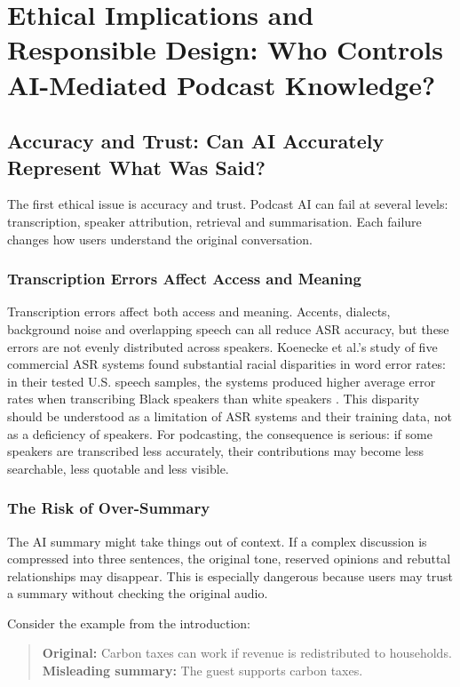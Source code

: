 \documentclass[11pt,a4paper]{article}
\begin{document}
\section{Ethical Implications and Responsible Design: Who Controls AI-Mediated Podcast Knowledge?}


\subsection{Accuracy and Trust: Can AI Accurately Represent What Was Said?}

The first ethical issue is accuracy and trust. Podcast AI can fail at several levels: transcription, speaker attribution, retrieval and summarisation. Each failure changes how users understand the original conversation.

\subsubsection{Transcription Errors Affect Access and Meaning}


Transcription errors affect both access and meaning. Accents, dialects, background noise and overlapping speech can all reduce ASR accuracy, but these errors are not evenly distributed across speakers. Koenecke et al.'s study of five commercial ASR systems found substantial racial disparities in word error rates: in their tested U.S. speech samples, the systems produced higher average error rates when transcribing Black speakers than white speakers \cite{Koenecke2020ASRBias}. This disparity should be understood as a limitation of ASR systems and their training data, not as a deficiency of speakers. For podcasting, the consequence is serious: if some speakers are transcribed less accurately, their contributions may become less searchable, less quotable and less visible.

\subsubsection{The Risk of Over-Summary}

The AI summary might take things out of context. If a complex discussion is compressed into three sentences, the original tone, reserved opinions and rebuttal relationships may disappear. This is especially dangerous because users may trust a summary without checking the original audio.

Consider the example from the introduction:

\begin{quote}
\textbf{Original:} Carbon taxes can work if revenue is redistributed to households.\\
\textbf{Misleading summary:} The guest supports carbon taxes.
\end{quote}
\end{document}
